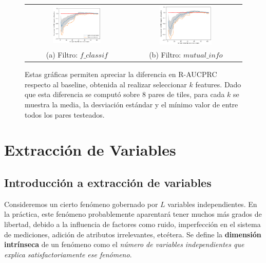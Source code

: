 \begin{figure}[h!]
\begin{tabular}{cc}
  \includegraphics[width=0.49\textwidth]{Kap5/rbfBEST_K_f_classif.png} &   \includegraphics[width=0.49\textwidth]{Kap5/rbfBEST_K_mutual_info_classif.png} \\
(a) Filtro: $f\_classif$ & (b) Filtro: $mutual\_info$
\end{tabular}
\caption{Estas gráficas permiten apreciar la diferencia en R-AUCPRC respecto al baseline, obtenida al realizar seleccionar $k$ features. Dado que esta diferencia se computó sobre 8 pares de tiles, para cada $k$ se muestra la media, la desviación estándar y el mínimo valor de entre todos los pares testeados. }
\label{fig:optimal_k_svmk}
\end{figure}

\section{Extracción de Variables}

\subsection{Introducción a extracción de variables}

Consideremos un cierto fenómeno gobernado por $L$ variables independientes. En la práctica, este fenómeno probablemente aparentará tener muchos más grados de libertad, debido a la influencia de factores como ruido, imperfección en el sistema de mediciones, adición de atributos irrelevantes, etcétera. Se define la \textbf{dimensión intrínseca} de un fenómeno como el \textit{número de variables independientes que explica satisfactoriamente ese 
fenómeno}\cite{carreira}. \\


